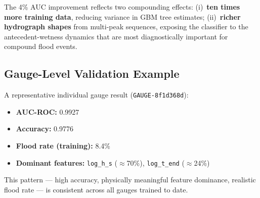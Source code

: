\documentclass[11pt,a4paper]{article}
\begin{document}
\noindent The 4\% AUC improvement reflects two compounding effects: (i)~\textbf{ten
times more training data}, reducing variance in GBM tree estimates; (ii)~\textbf{richer
hydrograph shapes} from multi-peak sequences, exposing the classifier to the
antecedent-wetness dynamics that are most diagnostically important for compound flood
events.

\subsection{Gauge-Level Validation Example}

A representative individual gauge result (\texttt{GAUGE-8f1d368d}):
\begin{itemize}[nosep]
  \item \textbf{AUC-ROC:} 0.9927
  \item \textbf{Accuracy:} 0.9776
  \item \textbf{Flood rate (training):} 8.4\%
  \item \textbf{Dominant features:} \texttt{log\_h\_s} ($\approx$70\%),
        \texttt{log\_t\_end} ($\approx$24\%)
\end{itemize}

This pattern --- high accuracy, physically meaningful feature dominance, realistic
flood rate --- is consistent across all gauges trained to date.

\mkmlimitations
\end{document}
